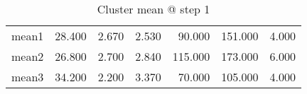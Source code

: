 \begin{table}[htbp]
  \centering
  \caption{Cluster mean @ step 1}
    \begin{tabular}{rrrrrrr}
    \toprule
    mean1 & 28.400  & 2.670  & 2.530  & 90.000  & 151.000  & 4.000  \\
    mean2 & 26.800  & 2.700  & 2.840  & 115.000  & 173.000  & 6.000  \\
    mean3 & 34.200  & 2.200  & 3.370  & 70.000  & 105.000  & 4.000  \\
    \bottomrule
    \end{tabular}%
  \label{tab:mean_b1}%
\end{table}%
